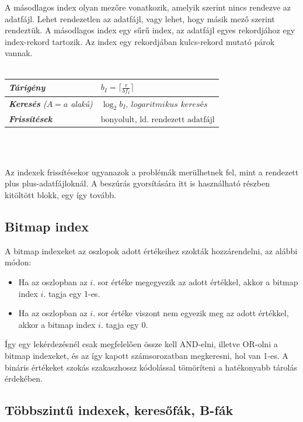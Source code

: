 \documentclass[12pt,margin=0px]{article}
\newcommand\ddfrac[2]{\frac{\displaystyle #1}{\displaystyle #2}}
\newcommand\lword[1]{\leavevmode\nobreak\hskip0pt plus\linewidth\penalty50\hskip0pt plus-\linewidth\nobreak #1}
\begin{document}
    A másodlagos index olyan mezőre vonatkozik, amelyik szerint nincs rendezve az adatfájl. Lehet rendezetlen az adatfájl, vagy lehet, hogy másik mező szerint rendeztük. A másodlagos index egy sűrű index, az adatfájl egyes rekordjához egy index-rekord tartozik. Az index egy rekordjában kulcs-rekord mutató párok vannak.\\\\
    \renewcommand{\arraystretch}{1.15}
    \begin{tabular}{|l|l|}
       \hline
       \textit{\textbf{Tárigény}}                  & $b_{I}=\lceil \ddfrac{r}{bf_{I}} \rceil$
       \\ \hline
       \textit{\textbf{Keresés} ($A=a$ alakú)}     & $\log_{2}b_{I},\ \textit{logaritmikus keresés}$
       \\ \hline
       \textit{\textbf{Frissítések}}               & $\text{bonyolult, ld. rendezett adatfájl}$
       \\ \hline
    \end{tabular}
    \renewcommand{\arraystretch}{1}\\\

    \noindent Az indexek frissítésekor ugyanazok a problémák merülhetnek fel, mint a rendezett \lword{adatfájloknál}. A beszúrás gyorsítására itt is használható részben kitöltött blokk, egy így tovább.

	\subsection*{Bitmap index}
	
	A bitmap indexeket az oszlopok adott értékeihez szokták hozzárendelni, az alábbi módon:
	\begin{itemize}
		\item	Ha az oszlopban az $i$. sor értéke megegyezik az adott értékkel, akkor a bitmap index $i$. tagja
		egy 1-es.	
		
		\item	Ha az oszlopban az $i$. sor értéke viszont nem egyezik meg az adott értékkel, akkor a bitmap
		index $i$. tagja egy 0.
	\end{itemize}

	\noindent Így egy lekérdezésnél csak megfelelően össze kell AND-elni, illetve OR-olni a bitmap indexeket, és az így kapott számsorozatban megkeresni, hol van 1-es. A bináris értékeket szokás szakaszhossz kódolással tömöríteni a hatékonyabb tárolás érdekében.

	\subsection*{Többszintű indexek, keresőfák, B-fák}
\end{document}
